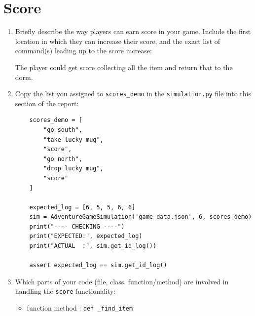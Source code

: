 \documentclass[11pt]{article}
\begin{document}
\section*{Score}
\begin{enumerate}

    \item Briefly describe the way players can earn score in your game. Include the first location in which they can increase their score, and the exact list of command(s) leading up to the score increase: 

    The player could get score collecting all the item and return that to the dorm.

    \item Copy the list you assigned to \texttt{scores\_demo} in the \texttt{simulation.py} file into this section of the report:
    \begin{verbatim}
    scores_demo = [
        "go south",
        "take lucky mug",
        "score",
        "go north",
        "drop lucky mug",
        "score"
    ]

    expected_log = [6, 5, 5, 6, 6]
    sim = AdventureGameSimulation('game_data.json', 6, scores_demo)
    print("---- CHECKING ----")
    print("EXPECTED:", expected_log)
    print("ACTUAL  :", sim.get_id_log())

    assert expected_log == sim.get_id_log()
    \end{verbatim}
    

    \item Which parts of your code (file, class, function/method) are involved in handling the \texttt{score} functionality:
    \begin{itemize}
        \item function method : \texttt{def \_find\_item}
    \end{itemize}
\end{enumerate}
\end{document}
